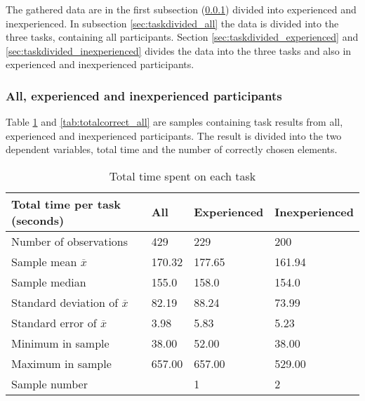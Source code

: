  The gathered data are in the first subsection (\ref{sec:alltasks}) divided into experienced and inexperienced. In subsection \ref{sec:taskdivided_all} the data is divided into the three tasks, containing all participants. Section \ref{sec:taskdivided_experienced}  and \ref{sec:taskdivided_inexperienced} divides the data into the three tasks and also in experienced and inexperienced participants. 
 

\subsubsection{All,  experienced and inexperienced participants}\label{sec:alltasks}

Table \ref{tab:totaltime_all} and \ref{tab:totalcorrect_all} are samples containing task results from all, experienced and inexperienced participants. The result is divided into the two dependent variables, total time and the number of correctly chosen elements.

\begin{table}[H]
	\centering
	\begin{tabular}{l|l|l|l}
		Total time per task (seconds)  & All  & Experienced & Inexperienced \\ \hline
		Number of observations & 429    & 229    & 200   \\
		Sample mean $\overline{x}$     & 170.32 & 177.65  & 161.94     \\
		Sample median  & 155.0 & 158.0  & 154.0  \\
		Standard deviation of $\overline{x}$  & 82.19  & 88.24  & 73.99   \\
		Standard error of $\overline{x}$  & 3.98  & 5.83 & 5.23  \\
		Minimum in sample & 38.00  & 52.00  & 38.00     \\
		Maximum in sample & 657.00 & 657.00  & 529.00    \\ \hline
		Sample number &   & 1  & 2   \\ \hline
	\end{tabular}
	\caption[Total time, all participants]{Total time spent on each task}
	\label{tab:totaltime_all}
\end{table}

